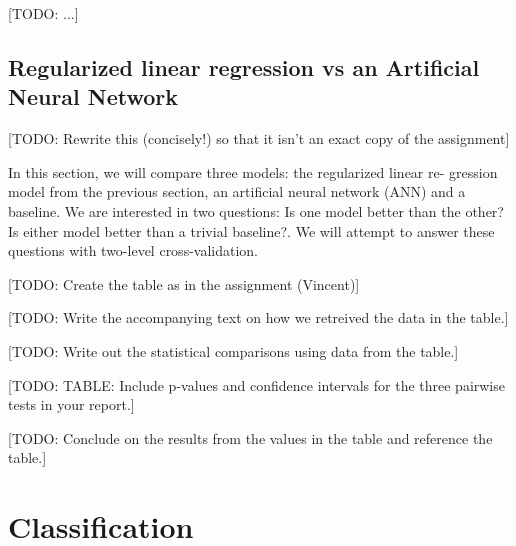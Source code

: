 \documentclass[dtu]{dtuarticle}
\newcommand{\todo}[1]{\color{red}[TODO: #1]\color{black}}
\begin{document}
	\todo{...}

	\subsection{Regularized linear regression vs an Artificial Neural Network}

	\todo{Rewrite this (concisely!) so that it isn't an exact copy of the assignment}

	In this section, we will compare three models: the regularized linear re-
	gression model from the previous section, an artificial neural network (ANN) and a baseline. We
	are interested in two questions: Is one model better than the other? Is either model better than
	a trivial baseline?. We will attempt to answer these questions with two-level cross-validation.

	\todo{Create the table as in the assignment (Vincent)}

	\todo{Write the accompanying text on how we retreived the data in the table.}

	\todo{Write out the statistical comparisons using data from the table.}

	\todo{TABLE: Include p-values and confidence intervals for the three pairwise tests in your report.}

	\todo{Conclude on the results from the values in the table and reference the table.}


	\section{Classification}
\end{document}
